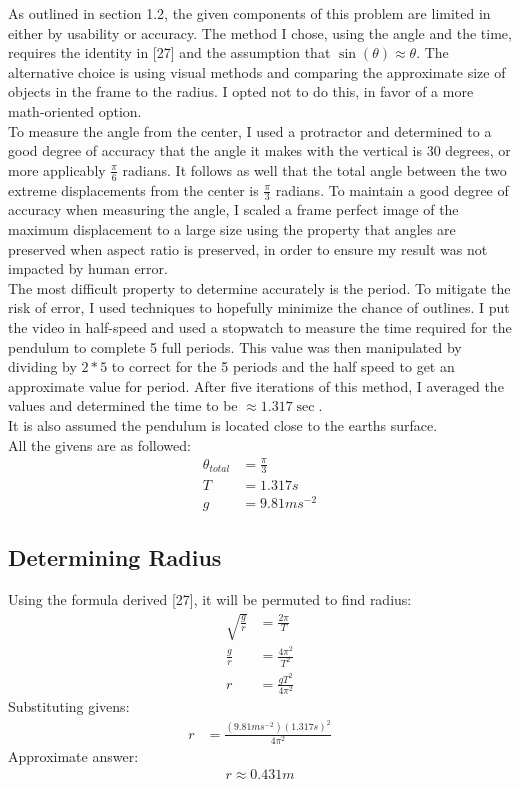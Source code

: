 \documentclass[11pt,a4paper]{article}
\begin{document}
As outlined in section 1.2,  the given components of this problem are limited in either by usability or accuracy.  The method I chose,  using the angle and the time,  requires the identity in [27] and the assumption that $\sin(\theta) \approx \theta$.  The alternative choice is using visual methods and comparing the approximate size of objects in the frame to the radius.  I opted not to do this, in favor of a more math-oriented option.  \\
To measure the angle from the center,  I used a protractor and determined to a good degree of accuracy that the angle it makes with the vertical is $30$ degrees,  or more applicably $\frac{\pi}{6}$ radians.  It follows as well that the total angle between the two extreme displacements from the center is $\frac{\pi}{3}$ radians.  To maintain a good degree of accuracy when measuring the angle,  I scaled a frame perfect image of the maximum displacement to a large size using the property that angles are preserved when aspect ratio is preserved,  in order to ensure my result was not impacted by human error.\\
The most difficult property to determine accurately is the period.  To mitigate the risk of error,  I used techniques to hopefully minimize the chance of outlines.  I put the video in half-speed and used a stopwatch to measure the time required for the pendulum to complete 5 full periods.  This value was then manipulated by dividing by $2*5$ to correct for the 5 periods and the half speed to get an approximate value for period.  After five iterations of this method,  I averaged the values and determined the time to be $\approx 1.317 \sec$. \\
It is also assumed the pendulum is located close to the earths surface. \\
All the givens are as followed:
\begin{align*}
\theta_{total} &= \frac{\pi}{3} \\
T &= 1.317 s \\
g &= 9.81 ms^{-2}
\end{align*}

\subsection{Determining Radius}

Using the formula derived [27],  it will be permuted to find radius:
\begin{align}
\sqrt{\frac{g}{r}} &=  \frac{2\pi}{T}\\
\frac{g}{r} &=  \frac{4\pi^2}{T^2}\\
r &= \frac{gT^2}{4\pi^2}
\end{align}
Substituting givens:
\begin{align}
r &= \frac{(9.81 ms^{-2})(1.317 s)^2}{4\pi^2}
\end{align}
Approximate answer:
\begin{align}
r \approx 0.431 m
\end{align}
\end{document}
